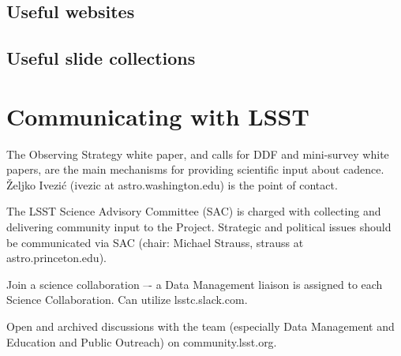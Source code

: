 \documentclass[DM,lsstdraft,toc,usenatbib]{lsstdoc}
\begin{document}
\subsection{Useful websites}

\subsection{Useful slide collections}


\section{Communicating with LSST} 

The Observing Strategy white paper, and calls for DDF and mini-survey white papers, 
are the main mechanisms for providing scientific input about cadence. 
\v{Z}eljko Ivezi\'{c} (ivezic at astro.washington.edu) is the point of contact.

The LSST Science Advisory Committee (SAC) is charged with collecting and delivering 
community input to the Project. Strategic and political issues should be communicated 
via SAC (chair: Michael Strauss, strauss at astro.princeton.edu).

Join a science collaboration –- a Data Management liaison is assigned to each Science Collaboration.
Can utilize lsstc.slack.com.

Open and archived discussions with the team (especially Data Management and Education and 
Public Outreach) on community.lsst.org.
\end{document}
